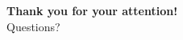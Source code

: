 \documentclass[aspectratio=169, 10pt]{beamer}
\begin{document}
\begin{frame}
    \begin{center}
        \Huge \textbf{Thank you for your attention!}\\
        \vspace{1cm}
        \Large Questions?
    \end{center}
\end{frame}
\end{document}
